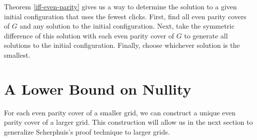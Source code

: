 \documentclass[a4paper]{article}
\begin{document}
	Theorem \ref{iff-even-parity} gives us a way to determine the solution to a given initial configuration that uses the fewest clicks.
	First, find all even parity covers of $G$ and any solution to the initial configuration.
	Next, take the symmetric difference of this solution with each even parity cover of $G$ to generate all solutions to the initial configuration.
	Finally, choose whichever solution is the smallest.

	\section{A Lower Bound on Nullity}
	For each even parity cover of a smaller grid, we can construct a unique even parity cover of a larger grid.
	This construction will allow us in the next section to generalize Scherphuis's proof technique to larger grids.
	
\end{document}
